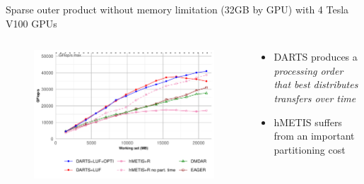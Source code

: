 \documentclass{libs/ufc_format}
\begin{document}
\begin{frame}[noframenumbering]{Sparse outer product without memory limitation (32GB by GPU) with 4 Tesla V100 GPUs}
    \begin{columns}{}
		\begin{column}{0.7\textwidth}
		\begin{figure}
			\center\includegraphics[scale = 0.45]{Images/GF_dynamic_data_aware_no_hfp_sparse_matrix_infinie_gemini-1-fgcs_4GPU.pdf}
		\end{figure}
		\end{column}
		\begin{column}{0.3\textwidth}
		\begin{itemize}
			\item DARTS produces a \emph{processing order that best distributes transfers over time} 
			\item hMETIS suffers from an important partitioning cost
		\end{itemize}
		\end{column}
	\end{columns}
\end{frame}
\end{document}
